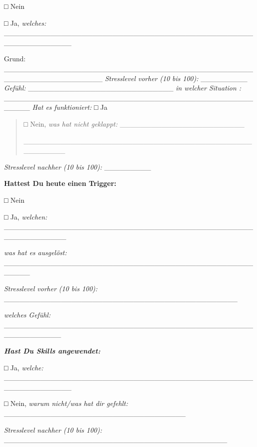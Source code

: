 □ Nein

□ Ja, \emph{welches:} \_\_\_\_\_\_\_\_\_\_\_\_\_\_\_\_\_\_\_\_\_\_\_\_\_\_\_\_\_\_\_\_\_\_\_\_\_\_\_\_\_\_\_\_\_\_\_\_\_\_\_\_\_\_\_\_\_\_\_\_\_

Grund: \_\_\_\_\_\_\_\_\_\_\_\_\_\_\_\_\_\_\_\_\_\_\_\_\_\_\_\_\_\_\_\_\_\_\_\_\_\_\_\_\_\_\_\_\_\_\_\_\_\_\_\_\_\_\_\_\_\_\_\_\_\_\_\_\_\_\_ \emph{Stresslevel vorher (10 bis 100):} \_\_\_\_\_\_\_\_\_ \emph{Gefühl:} \_\_\_\_\_\_\_\_\_\_\_\_\_\_\_\_\_\_\_\_\_\_\_\_\_\_\_\_ \emph{in welcher Situation :} \_\_\_\_\_\_\_\_\_\_\_\_\_\_\_\_\_\_\_\_\_\_\_\_\_\_\_\_\_\_\_\_\_\_\_\_\_\_\_\_\_\_\_\_\_\_\_\_\_\_\_\_\_ \emph{Hat es funktioniert:} □ Ja

\begin{quote}
□ Nein, \emph{was hat nicht geklappt:} \_\_\_\_\_\_\_\_\_\_\_\_\_\_\_\_\_\_\_\_\_\_\_\_

\_\_\_\_\_\_\_\_\_\_\_\_\_\_\_\_\_\_\_\_\_\_\_\_\_\_\_\_\_\_\_\_\_\_\_\_\_\_\_\_\_\_\_\_\_\_\_\_\_\_\_\_
\end{quote}

\emph{Stresslevel nachher (10 bis 100):} \_\_\_\_\_\_\_\_\_

\textbf{Hattest Du heute einen Trigger:}

□ Nein

□ Ja, \emph{welchen:} \_\_\_\_\_\_\_\_\_\_\_\_\_\_\_\_\_\_\_\_\_\_\_\_\_\_\_\_\_\_\_\_\_\_\_\_\_\_\_\_\_\_\_\_\_\_\_\_\_\_\_\_\_\_\_\_\_\_\_\_

\emph{was hat es ausgelöst:} \_\_\_\_\_\_\_\_\_\_\_\_\_\_\_\_\_\_\_\_\_\_\_\_\_\_\_\_\_\_\_\_\_\_\_\_\_\_\_\_\_\_\_\_\_\_\_\_\_\_\_\_\_

\emph{Stresslevel vorher (10 bis 100):} \_\_\_\_\_\_\_\_\_\_\_\_\_\_\_\_\_\_\_\_\_\_\_\_\_\_\_\_\_\_\_\_\_\_\_\_\_\_\_\_\_\_\_\_\_

\emph{welches Gefühl:} \_\_\_\_\_\_\_\_\_\_\_\_\_\_\_\_\_\_\_\_\_\_\_\_\_\_\_\_\_\_\_\_\_\_\_\_\_\_\_\_\_\_\_\_\_\_\_\_\_\_\_\_\_\_\_\_\_\_\_

\emph{\textbf{Hast Du Skills angewendet:}}

□ Ja, \emph{welche:} \_\_\_\_\_\_\_\_\_\_\_\_\_\_\_\_\_\_\_\_\_\_\_\_\_\_\_\_\_\_\_\_\_\_\_\_\_\_\_\_\_\_\_\_\_\_\_\_\_\_\_\_\_\_\_\_\_\_\_\_\_

□ Nein, \emph{warum nicht/was hat dir gefehlt:} \_\_\_\_\_\_\_\_\_\_\_\_\_\_\_\_\_\_\_\_\_\_\_\_\_\_\_\_\_\_\_\_\_\_\_

\emph{Stresslevel nachher (10 bis 100):} \_\_\_\_\_\_\_\_\_\_\_\_\_\_\_\_\_\_\_\_\_\_\_\_\_\_\_\_\_\_\_\_\_\_\_\_\_\_\_\_\_\_\_

